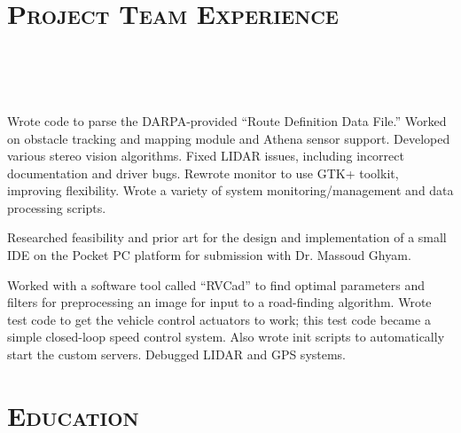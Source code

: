 \begin{resume}
\section{\textsc{Project Team Experience}}
\begin{formatb}
  \\
  \\
  \body\\
\end{formatb}

\begin{position}
  Wrote code to parse the DARPA-provided “Route Definition Data File.”
  Worked on obstacle tracking and mapping module and Athena sensor
  support.  Developed various stereo vision algorithms.  Fixed LIDAR
  issues, including incorrect documentation and driver bugs.  Rewrote
  monitor to use GTK+ toolkit, improving flexibility.  Wrote a variety
  of system monitoring/management and data processing scripts.
\end{position}

\begin{position}
  Researched feasibility and prior art for the design and
  implementation of a small IDE on the Pocket PC platform for
  submission with Dr. Massoud Ghyam.
\end{position}

\begin{position}
  Worked with a software tool called ``RVCad'' to find optimal
  parameters and filters for preprocessing an image for input to a
  road-finding algorithm. Wrote test code to get the vehicle control
  actuators to work; this test code became a simple closed-loop speed
  control system. Also wrote init scripts to automatically start the
  custom servers. Debugged LIDAR and GPS systems.
\end{position}

\section{\textsc{Education}}
\begin{formatb}
  \\
  \body\\
\end{formatb}


\end{resume}
